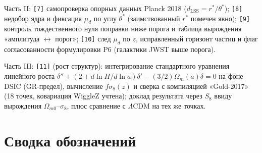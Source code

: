 \documentclass{article}
\begin{document}
Часть II: \texttt{[7]} самопроверка опорных данных Planck 2018 ($d_{\text{LSS}} = r^*/\theta^*$); \texttt{[8]} недобор ядра и фиксация $\mu_d$ по углу $\theta^*$ (заимствованный $r^*$ помечен явно); \texttt{[9]} контроль тождественного нуля поправки ниже порога и таблица вырождения «амплитуда $\leftrightarrow$ порог»; \texttt{[10]} след $\mu_d$ по $z$, исправленный горизонт частиц и флаг согласованности формулировки P6 (галактики JWST выше порога).

Часть III: \texttt{[11]} (рост структур): интегрирование стандартного уравнения линейного роста $\delta'' + (2 + d\ln H/d\ln a)\delta' - (3/2)\Omega_m(a)\delta = 0$ на фоне DSIC (GR-предел), вычисление $f\sigma_8(z)$ и сверка с компиляцией «Gold-2017» (18 точек, ковариация WiggleZ учтена); доклад результата через $S_8$ ввиду вырождения $\Omega_{m0}$--$\sigma_8$, плюс сравнение с $\Lambda$CDM на тех же точках.

\appendix

\section{Сводка обозначений}
\end{document}
